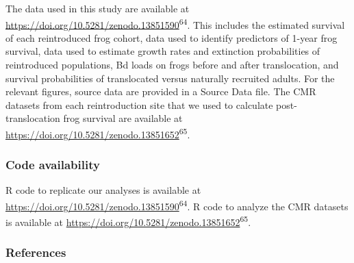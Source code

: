 \documentclass[
  letterpaper,
  DIV=11,
  numbers=noendperiod]{scrartcl}
\begin{document}
The data used in this study are available at
\url{https://doi.org/10.5281/zenodo.13851590}\textsuperscript{64}. This
includes the estimated survival of each reintroduced frog cohort, data
used to identify predictors of 1-year frog survival, data used to
estimate growth rates and extinction probabilities of reintroduced
populations, Bd loads on frogs before and after translocation, and
survival probabilities of translocated versus naturally recruited
adults. For the relevant figures, source data are provided in a Source
Data file. The CMR datasets from each reintroduction site that we used
to calculate post-translocation frog survival are available at
\url{https://doi.org/10.5281/zenodo.13851652}\textsuperscript{65}.

\subsubsection{Code availability}\label{code-availability}

R code to replicate our analyses is available at
\url{https://doi.org/10.5281/zenodo.13851590}\textsuperscript{64}. R
code to analyze the CMR datasets is available at
\url{https://doi.org/10.5281/zenodo.13851652}\textsuperscript{65}.

\subsubsection{References}\label{references}
\end{document}
